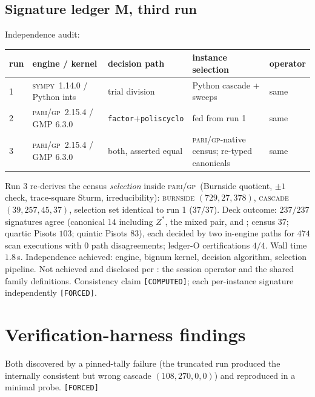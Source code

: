 \documentclass[11pt]{article}
\newcommand{\F}{\textnormal{\texttt{[FORCED]}}}
\newcommand{\C}{\textnormal{\texttt{[COMPUTED]}}}
\newcommand{\gp}{\textsc{pari/gp}}
\newcommand{\sy}{\textsc{sympy}}
\theoremstyle{definition}
\begin{document}
\subsection{Signature ledger M, third run}\label{sec:ledgerM}
Independence audit:

\begin{center}
\footnotesize
\begin{tabular}{lllll}
\hline
run & engine / kernel & decision path & instance selection & operator\\
\hline
1 & \sy~1.14.0 / Python ints & trial division & Python cascade + sweeps & same\\
2 & \gp~2.15.4 / GMP 6.3.0 & \texttt{factor}+\texttt{poliscyclo} & fed from run 1 & same\\
3 & \gp~2.15.4 / GMP 6.3.0 & both, asserted equal & \gp-native census; re-typed canonicals & same\\
\hline
\end{tabular}
\end{center}

Run 3 re-derives the census \emph{selection} inside \gp\ (Burnside quotient,
$\pm1$ check, trace-square Sturm, irreducibility): \textsc{burnside}
$(729,27,378)$, \textsc{cascade} $(39,257,45,37)$, selection set identical to
run 1 ($37/37$). Deck outcome: $237/237$ signatures agree
(canonical $14$ including $Z^{*}$, the mixed pair, and \cite[Ex.~7.18]{relcharge};
census $37$; quartic Pisots $103$; quintic Pisots $83$), each decided by two
in-engine paths for $474$ scan executions with $0$ path disagreements; ledger-O
certifications $4/4$. Wall time $1.8$\,s. Independence achieved: engine, bignum
kernel, decision algorithm, selection pipeline. Not achieved and disclosed per
\cite[\S9]{relcharge}: the session operator and the shared family definitions.
Consistency claim \C; each per-instance signature independently \F.

\section{Verification-harness findings}\label{sec:harness}

Both discovered by a pinned-tally failure (the truncated run produced the
internally consistent but wrong cascade $(108,270,0,0)$) and reproduced in a
minimal probe. \F
\end{document}
